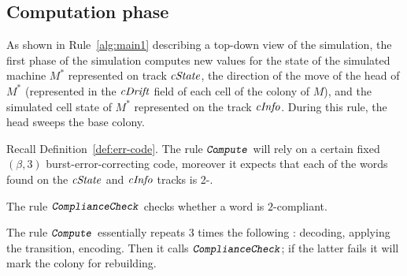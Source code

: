 \documentclass[12pt]{memoir}
\newcommand{\fld}[1]{\ensuremath{\textit{#1\/}}}
\newcommand{\rul}[1]{\ensuremath{\texttt{\slshape #1\/}}}
\newcommand{\cDrift}{\fld{cDrift}}
\newcommand{\cInfo}{\fld{cInfo}}
\newcommand{\cState}{\fld{cState}}
\newcommand{\Comp}{\rul{Compute}}
\begin{document}
\subsection{Computation phase}\label{sec:computation-phase}

As shown in Rule~\ref{alg:main1} describing a top-down view of the simulation,
the first phase of the simulation computes new values for the state of the 
simulated machine \( M^{*} \)
represented on track \( \cState \), the direction of the move of the head of  \( M^{*} \)
(represented in the \( \cDrift \) field of each cell of the colony of \( M \)), and
the simulated cell state of \( M^{*} \) represented on the track \( \cInfo \).
During this rule, the head sweeps the base colony.

Recall Definition~\ref{def:err-code}.
The rule \( \Comp \) will rely on a certain fixed \( (\beta,3) \) burst-error-correcting
code, moreover
it expects that each of the words found on the \( \cState \) and \( \cInfo \) tracks
is 2-.  %

The rule \( \rul{ComplianceCheck} \) checks whether a word is \( 2 \)-compliant.

The rule \( \Comp \) essentially repeats 3 times %
the following : decoding, applying the transition, encoding.
Then it calls \( \rul{ComplianceCheck} \); if the latter fails
it will mark the colony for rebuilding.
\end{document}
